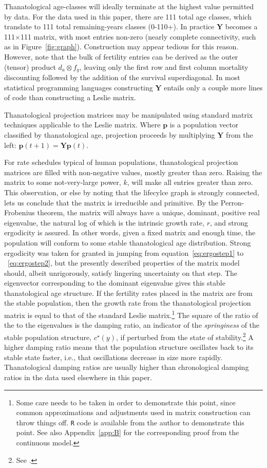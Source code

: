\documentclass{article}
\begin{document}
Thanatological age-classes will ideally terminate at the highest value permitted
by data. For the data used in this paper, there are 111 total age classes, which
translate to 111 total remaining-years classes (0-110+). In practice $\textbf{Y}$ becomes
a 111$\times$111 matrix, with most entries non-zero (nearly complete
connectivity, such as in Figure~\ref{fig:graph}). Construction may appear tedious for
this reason. However, note that the bulk of fertility entries can be derived as the outer (tensor) product $d_a \otimes f_y$, leaving only the first row and first column mortality discounting followed by the addition of the
survival superdiagonal. In most statistical programming languages constructing $\textbf{Y}$ entails only
a couple more lines of code than constructing a Leslie matrix.

Thanatological projection matrices may be manipulated using
standard matrix techniques applicable to the Leslie matrix. Where $\textbf{p}$
is a population vector classified by thanatological age, projection proceeds by
multiplying $\textbf{Y}$ from the left:
$\textbf{p}(t + 1) = \textbf{Y}\textbf{p}(t)$. 

For rate schedules typical of human populations, thanatological projection
matrices are filled with non-negative values, mostly greater than zero. Raising
the matrix to some not-very-large power, $k$, will make all entries greater than zero. This observation, or else by noting that the
lifecylce graph is strongly connected, lets us conclude that the matrix is
irreducible and primitive. By the Perron-Frobenius theorem, the matrix will
 always have a unique, dominant, positive real eigenvalue, the natural
log of which is the intrinsic growth rate, $r$, and strong ergodicity is
assured.
In other words, given a fixed matrix and enough time, the population will conform to some stable thanatological age distribution. Strong
ergodicity was taken for granted in jumping from equation~\eqref{eq:ergostep1}
to ~\eqref{eq:ergostep2}, but the presently described properties of the matrix
model should, albeit unrigorously, satisfy lingering uncertainty on that step.
The eigenvector corresponding to the dominant eigenvalue gives this stable
thanatological age structure. If the fertility rates placed in the matrix are
from the stable population, then the growth rate from the thanatological
projection matrix is equal to that of the standard Leslie
matrix.\footnote{Some care needs to be taken in order to demonstrate this
point, since common approximations and adjustments used in matrix
construction can throw things off. \texttt{R} code is available from the
author to demonstrate this point. See also Appendix~\ref{app:B} for the
corresponding proof from the continuous model.} The square of the ratio of
the  to the  eigenvalues is the damping ratio, an indicator of the
\textit{springiness} of the stable population structure, $c^\star(y)$, if perturbed from the
state of stability.\footnote{See \citet[p.86-87]{caswell2001matrix}.} A higher
damping ratio means that the population structure oscillates back to its stable
state faster, i.e., that oscillations decrease in size more rapidly.
Thanatological damping ratios are usually higher than chronological damping
ratios in the data used elsewhere in this paper.
\end{document}
